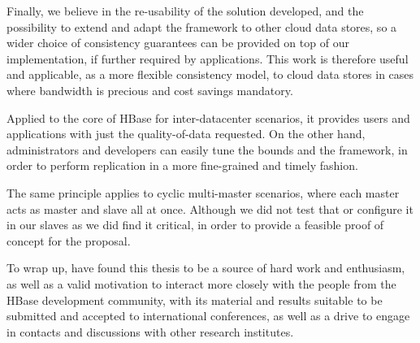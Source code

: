 Finally, we believe in the re-usability of the solution developed, and the possibility to extend and adapt the framework to other cloud data stores, so a wider choice of consistency guarantees can be provided on top of our implementation, if further required by applications. This work is therefore useful and applicable, as a more flexible consistency model, to cloud data stores in cases where bandwidth is precious and cost savings mandatory.

Applied to the core of HBase for inter-datacenter scenarios, it provides users and applications with just the quality-of-data requested. On the other hand, administrators and developers can easily tune the bounds and the framework, in order to perform replication in a more fine-grained and timely fashion.

The same principle applies to cyclic multi-master scenarios, where each master acts as master and slave all at once. Although we did not test that or configure it in our slaves as we did find it critical, in order to provide a feasible proof of concept for the proposal.

To wrap up, have found this thesis to be a source of hard work and enthusiasm, as well as a valid motivation to interact more closely with the people from the HBase development community, with its material and results suitable to be submitted and accepted to international conferences, as well as a drive to engage in contacts and discussions with other research institutes.



